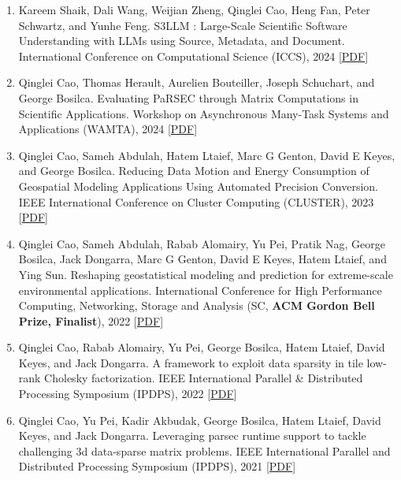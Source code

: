 \documentclass{resume} %
\let\OrigRSection\rSection
\let\OrigEndRSection\endrSection
\let\OrigMakeUppercase\MakeUppercase
\renewenvironment{rSection}[1]{
    \renewcommand{\MakeUppercase}[1]{\textcolor{blue}{\OrigMakeUppercase{##1}}}%
    \OrigRSection{#1}%
}{%
    \OrigEndRSection%
}
\begin{document}
\begin{rSection}{\faBook~Publications}
\begin{itemize}
\begin{enumerate}[leftmargin=8pt, align=left]
    \item Kareem Shaik, Dali Wang, Weijian Zheng, Qinglei Cao, Heng Fan, Peter Schwartz, and Yunhe Feng. S3LLM : Large-Scale Scientific Software Understanding with LLMs using Source, Metadata, and Document. International Conference on Computational Science (ICCS), 2024 \hfill[\href{https://qingleicao.com/papers/S3LLM- Large-Scale Scientific Software Understanding with LLMs using Source, Metadata, and Document.pdf}{PDF}]
    \item Qinglei Cao, Thomas Herault, Aurelien Bouteiller, Joseph Schuchart, and George Bosilca. Evaluating PaRSEC through Matrix Computations in Scientific Applications. Workshop on Asynchronous Many-Task Systems and Applications (WAMTA), 2024 \hfill[\href{https://qingleicao.com/papers/Evaluating PaRSEC Through Matrix Computations in Scientific Applications.pdf}{PDF}]
    \item {Qinglei Cao}, Sameh Abdulah, Hatem Ltaief, Marc G Genton, David E Keyes, and George Bosilca. Reducing Data Motion and Energy Consumption of Geospatial Modeling Applications Using Automated Precision Conversion. IEEE International Conference on Cluster Computing ({CLUSTER}), 2023 \hfill[\href{https://qingleicao.com/papers/Reducing Data Motion and Energy Consumption of Geospatial Modeling Applications Using Automated Precision Conversion.pdf}{PDF}]
    \item {Qinglei Cao}, Sameh Abdulah, Rabab Alomairy, Yu Pei, Pratik Nag, George Bosilca, Jack Dongarra, Marc G Genton, David E Keyes, Hatem Ltaief, and Ying Sun. Reshaping geostatistical modeling and prediction for extreme-scale environmental applications. International Conference for High Performance Computing, Networking, Storage and Analysis (SC, {\bf ACM Gordon Bell Prize, Finalist}), 2022 \hfill[\href{https://qingleicao.com/papers/Reshaping geostatistical modeling and prediction for extreme-scale environmental applications.pdf}{PDF}]
    \item {Qinglei Cao}, Rabab Alomairy, Yu Pei, George Bosilca, Hatem Ltaief, David Keyes, and Jack Dongarra. A framework to exploit data sparsity in tile low-rank Cholesky factorization. IEEE International Parallel \& Distributed Processing Symposium ({IPDPS}), 2022 \hfill[\href{https://qingleicao.com/papers/A Framework to Exploit Data Sparsity in Tile Low-Rank Cholesky Factorization.pdf}{PDF}]
    \item {Qinglei Cao}, Yu Pei, Kadir Akbudak, George Bosilca, Hatem Ltaief, David Keyes, and Jack Dongarra. Leveraging parsec runtime support to tackle challenging 3d data-sparse matrix problems. IEEE International Parallel and Distributed Processing Symposium ({IPDPS}), 2021 \hfill[\href{https://qingleicao.com/papers/Leveraging PaRSEC Runtime Support to Tackle Challenging 3D Data-Sparse Matrix Problems.pdf}{PDF}]

\end{enumerate}
\end{itemize}
\end{rSection}
\end{document}
